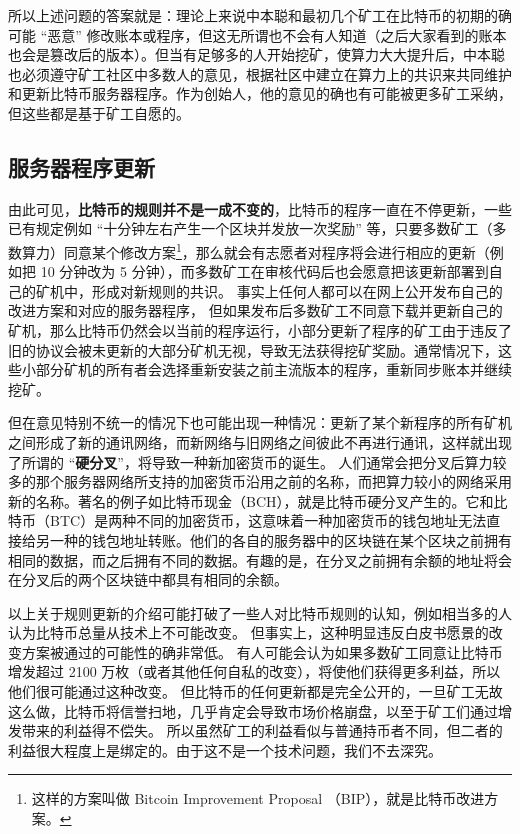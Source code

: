 所以上述问题的答案就是：理论上来说中本聪和最初几个矿工在比特币的初期的确可能 “恶意” 修改账本或程序，但这无所谓也不会有人知道（之后大家看到的账本也会是篡改后的版本）。但当有足够多的人开始挖矿，使算力大大提升后，中本聪也必须遵守矿工社区中多数人的意见，根据社区中建立在算力上的共识来共同维护和更新比特币服务器程序。作为创始人，他的意见的确也有可能被更多矿工采纳，但这些都是基于矿工自愿的。

\subsection{服务器程序更新}
由此可见，\textbf{比特币的规则并不是一成不变的}，比特币的程序一直在不停更新，一些已有规定例如 “十分钟左右产生一个区块并发放一次奖励” 等，只要多数矿工（多数算力）同意某个修改方案\footnote{这样的方案叫做 Bitcoin Improvement Proposal （BIP），就是比特币改进方案。}，那么就会有志愿者对程序将会进行相应的更新（例如把 10 分钟改为 5 分钟），而多数矿工在审核代码后也会愿意把该更新部署到自己的矿机中，形成对新规则的共识。 事实上任何人都可以在网上公开发布自己的改进方案和对应的服务器程序， 但如果发布后多数矿工不同意下载并更新自己的矿机，那么比特币仍然会以当前的程序运行，小部分更新了程序的矿工由于违反了旧的协议会被未更新的大部分矿机无视，导致无法获得挖矿奖励。通常情况下，这些小部分矿机的所有者会选择重新安装之前主流版本的程序，重新同步账本并继续挖矿。

但在意见特别不统一的情况下也可能出现一种情况：更新了某个新程序的所有矿机之间形成了新的通讯网络，而新网络与旧网络之间彼此不再进行通讯，这样就出现了所谓的 “\textbf{硬分叉}”，将导致一种新加密货币的诞生。 人们通常会把分叉后算力较多的那个服务器网络所支持的加密货币沿用之前的名称，而把算力较小的网络采用新的名称。著名的例子如比特币现金（BCH），就是比特币硬分叉产生的。它和比特币（BTC）是两种不同的加密货币，这意味着一种加密货币的钱包地址无法直接给另一种的钱包地址转账。他们的各自的服务器中的区块链在某个区块之前拥有相同的数据，而之后拥有不同的数据。有趣的是，在分叉之前拥有余额的地址将会在分叉后的两个区块链中都具有相同的余额。

以上关于规则更新的介绍可能打破了一些人对比特币规则的认知，例如相当多的人认为比特币总量从技术上不可能改变。 但事实上，这种明显违反白皮书愿景的改变方案被通过的可能性的确非常低。 有人可能会认为如果多数矿工同意让比特币增发超过 2100 万枚（或者其他任何自私的改变），将使他们获得更多利益，所以他们很可能通过这种改变。 但比特币的任何更新都是完全公开的，一旦矿工无故这么做，比特币将信誉扫地，几乎肯定会导致市场价格崩盘，以至于矿工们通过增发带来的利益得不偿失。 所以虽然矿工的利益看似与普通持币者不同，但二者的利益很大程度上是绑定的。由于这不是一个技术问题，我们不去深究。

